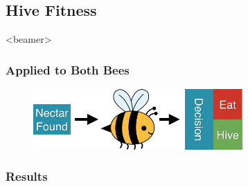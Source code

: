 \documentclass{beamer}
\begin{document}

    \subsection{Hive Fitness} %
    \label{sub:hive_fitness}
      
      \setcounter{tocdepth}{2}
        \begin{frame}<beamer>
        \end{frame}
      \setcounter{tocdepth}{3}


        \begin{frame}[c]\frametitle{Applied to Both Bees}
          \begin{figure}
          \includegraphics[width=8cm]{bee_diagrams/naive_sysem.png}
          \end{figure}
        \end{frame}

      \subsubsection{Results} %
      \label{ssub:results}
\end{document}
